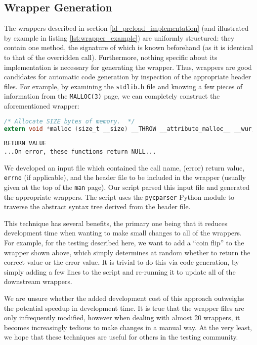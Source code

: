 \subsection{Wrapper Generation}
The wrappers described in section \ref{ld_preload_implementation} (and illustrated by example in listing \ref{lst:wrapper_example}) are uniformly structured: they contain one method, the signature of which is known beforehand (as it is identical to that of the overridden call). Furthermore, nothing specific about its implementation is necessary for generating the wrapper. Thus, wrappers are good candidates for automatic code generation by inspection of the appropriate header files. For example, by examining the \texttt{stdlib.h} file and knowing a few pieces of information from the \texttt{MALLOC(3)} page, we can completely construct the aforementioned wrapper:

\begin{lstlisting}[caption=Excerpt from \texttt{/usr/include/stdlib.h}, language=C]
/* Allocate SIZE bytes of memory.  */
extern void *malloc (size_t __size) __THROW __attribute_malloc__ __wur;
\end{lstlisting}

\begin{lstlisting}[caption=Excerpt from \texttt{MALLOC(3)}]
RETURN VALUE
...On error, these functions return NULL...
\end{lstlisting}

We developed an input file which contained the call name, (error) return value, \texttt{errno} (if applicable), and the header file to be included in the wrapper (usually given at the top of the \texttt{man} page). Our script parsed this input file and generated the appropriate wrappers. The script uses the \texttt{pycparser} Python module \cite{pycparser} to traverse the abstract syntax tree derived from the header file.

This technique has several benefits, the primary one being that it reduces development time when wanting to make small changes to all of the wrappers. For example, for the testing described here, we want to add a ``coin flip'' to the wrapper shown above, which simply determines at random whether to return the correct value or the error value. It is trivial to do this via code generation, by simply adding a few lines to the script and re-running it to update all of the downstream wrappers.

We are unsure whether the added development cost of this approach outweighs the potential speedup in development time. It is true that the wrapper files are only infrequently modified, however when dealing with almost 20 wrappers, it becomes increasingly tedious to make changes in a manual way. At the very least, we hope that these techniques are useful for others in the testing community.